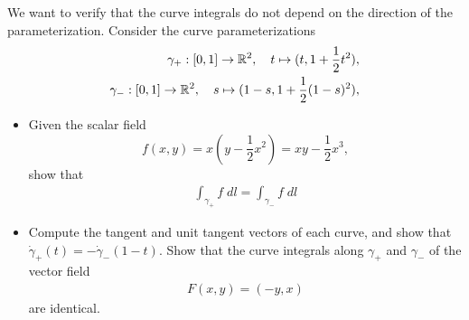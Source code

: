 \documentclass[11pt]{article}
\begin{document}
\begin{exercise}
    We want to verify that the curve integrals do not depend on the direction of the parameterization.
    Consider the curve parameterizations
    \begin{align}
        \gamma_+ : [0,1] \rightarrow \mathbb{R}^2, \quad t \mapsto ( t, 1 + \frac 1 2 t^2 ),
        \\
        \gamma_- : [0,1] \rightarrow \mathbb{R}^2, \quad s \mapsto ( 1-s, 1 + \frac 1 2 (1-s)^2 ),
    \end{align}
    \begin{itemize}
     \item Given the scalar field 
     \[
        f(x,y) 
        = x ( y - \frac 1 2 x^2 )
        = x y - \frac 1 2 x^3
        ,
     \]
     show that 
     \begin{align}
        \int_{\gamma_+} f \;dl = \int_{\gamma_-} f \;dl
     \end{align}
     \item Compute the tangent and unit tangent vectors of each curve,
     and show that $\dot\gamma_+(t) = - \dot\gamma_-(1-t)$.
     Show that the curve integrals along $\gamma_+$ and $\gamma_-$ of the vector field
     \begin{align}
        F(x,y) = (-y,x)
     \end{align}
     are identical.
    \end{itemize}
\end{exercise}
\end{document}
